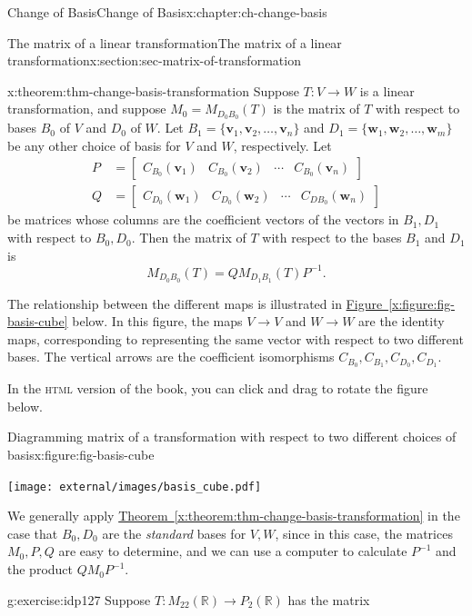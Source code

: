 \documentclass[oneside,10pt,]{book}
\newcommand{\xreffont}{\relax}
\newcommand{\initialism}[1]{\textsc{\MakeLowercase{#1}}}
\numberwithin{equation}{section}
\newcommand{\bbm}{\begin{bmatrix}}
\newcommand{\ebm}{\end{bmatrix}}
\newcommand{\R}{\mathbb{R}}
\newcommand{\vv}{\mathbf{v}}
\newcommand{\ww}{\mathbf{w}}
\newcommand{\basis}[2]{\{\mathbf{#1}_1,\mathbf{#1}_2,\ldots,\mathbf{#1}_{#2}\}}
\newcommand{\amp}{&}
\begin{document}
\begin{chapterptx}{Change of Basis}{}{Change of Basis}{}{}{x:chapter:ch-change-basis}
\begin{sectionptx}{The matrix of a linear transformation}{}{The matrix of a linear transformation}{}{}{x:section:sec-matrix-of-transformation}
\begin{theorem}{}{}{x:theorem:thm-change-basis-transformation}%
Suppose \(T:V\to W\) is a linear transformation, and suppose \(M_0 = M_{D_0B_0}(T)\) is the matrix of \(T\) with respect to bases \(B_0\) of \(V\) and \(D_0\) of \(W\). Let \(B_1=\basis{v}{n}\) and \(D_1=\basis{w}{m}\) be any other choice of basis for \(V\) and \(W\), respectively. Let%
\begin{align*}
P \amp =\bbm C_{B_0}(\vv_1) \amp C_{B_0}(\vv_2) \amp \cdots \amp C_{B_0}(\vv_n)\ebm\\
Q \amp =\bbm C_{D_0}(\ww_1) \amp C_{D_0}(\ww_2) \amp \cdots \amp C_{DB_0}(\ww_n)\ebm
\end{align*}
be matrices whose columns are the coefficient vectors of the vectors in \(B_1,D_1\) with respect to \(B_0,D_0\). Then the matrix of \(T\) with respect to the bases \(B_1\) and \(D_1\) is%
\begin{equation*}
M_{D_0B_0}(T) = QM_{D_1B_1}(T)P^{-1}\text{.}
\end{equation*}
%
\end{theorem}
The relationship between the different maps is illustrated in \hyperref[x:figure:fig-basis-cube]{Figure~{\xreffont\ref{x:figure:fig-basis-cube}}} below. In this figure, the maps \(V\to V\) and \(W\to W\) are the identity maps, corresponding to representing the same vector with respect to two different bases. The vertical arrows are the coefficient isomorphisms \(C_{B_0},C_{B_1},C_{D_0},C_{D_1}\).%
\par
In the \initialism{HTML} version of the book, you can click and drag to rotate the figure below.%
\begin{figureptx}{Diagramming matrix of a transformation with respect to two different choices of basis}{x:figure:fig-basis-cube}{}%
\centering
\begin{image}{0.165}{0.67}{0.165}%
\texttt{[image: external/images/basis\_cube.pdf]}
\end{image}%
\tcblower
\end{figureptx}%
We generally apply \hyperref[x:theorem:thm-change-basis-transformation]{Theorem~{\xreffont\ref{x:theorem:thm-change-basis-transformation}}} in the case that \(B_0,D_0\) are the \emph{standard} bases for \(V,W\), since in this case, the matrices \(M_0, P, Q\) are easy to determine, and we can use a computer to calculate \(P^{-1}\) and the product \(QM_0P^{-1}\).%
\begin{inlineexercise}{}{g:exercise:idp127}%
Suppose \(T:M_{22}(\R)\to P_2(\R)\) has the matrix%
\begin{equation*}

\end{equation*}
\end{inlineexercise}
\end{sectionptx}
\end{chapterptx}
\end{document}
